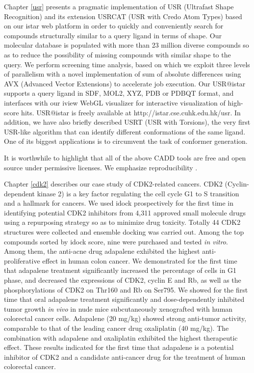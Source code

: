 Chapter \ref{usr} presents a pragmatic implementation of USR (Ultrafast Shape Recognition) \citep{1379} and its extension USRCAT (USR with Credo Atom Types) \citep{1331} based on our istar web platform in order to quickly and conveniently search for compounds structurally similar to a query ligand in terms of shape. Our molecular database is populated with more than 23 million diverse compounds so as to reduce the possibility of missing compounds with similar shape to the query. We perform screening time analysis, based on which we exploit three levels of parallelism with a novel implementation of sum of absolute differences using AVX (Advanced Vector Extensions) to accelerate job execution. Our USR@istar supports a query ligand in SDF, MOL2, XYZ, PDB or PDBQT format, and interfaces with our iview WebGL visualizer for interactive visualization of high-score hits. USR@istar is freely available at http://istar.cse.cuhk.edu.hk/usr. In addition, we have also briefly described USRT (USR with Torsions), the very first USR-like algorithm that can identify different conformations of the same ligand. One of its biggest applications is to circumvent the task of conformer generation.

It is worthwhile to highlight that all of the above CADD tools are free and open source under permissive licenses. We emphasize reproducibility \citep{965}.

Chapter \ref{cdk2} describes our case study of CDK2-related cancers. CDK2 (Cyclin-dependent kinase 2) is a key factor regulating the cell cycle G1 to S transition and a hallmark for cancers. We used idock \citep{1153,1362} prospectively for the first time in identifying potential CDK2 inhibitors from 4,311 approved small molecule drugs using a repurposing strategy so as to minimize drug toxicity. Totally 44 CDK2 structures were collected and ensemble docking was carried out. Among the top compounds sorted by idock score, nine were purchased and tested \textit{in vitro}. Among them, the anti-acne drug adapalene exhibited the highest anti-proliferative effect in human colon cancer. We demonstrated for the first time that adapalene treatment significantly increased the percentage of cells in G1 phase, and decreased the expressions of CDK2, cyclin E and Rb, as well as the phosphorylations of CDK2 on Thr160 and Rb on Ser795. We showed for the first time that oral adapalene treatment significantly and dose-dependently inhibited tumor growth \textit{in vivo} in nude mice subcutaneously xenografted with human colorectal cancer cells. Adapalene (20 mg/kg) showed strong anti-tumor activity, comparable to that of the leading cancer drug oxaliplatin (40 mg/kg). The combination with adapalene and oxaliplatin exhibited the highest therapeutic effect. These results indicated for the first time that adapalene is a potential inhibitor of CDK2 and a candidate anti-cancer drug for the treatment of human colorectal cancer.

